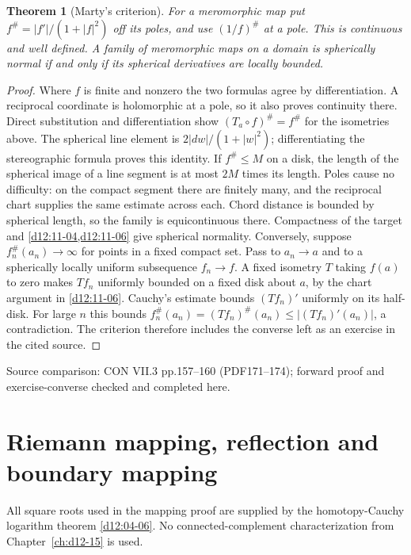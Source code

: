 \documentclass[11pt,a4paper,openany]{book}
\newtheorem{theorem}{Theorem}[chapter]
\theoremstyle{definition}
\theoremstyle{remark}\newtheorem{remark}[theorem]{Remark}
\newcommand{\family}[1]{}
\newcommand{\source}[1]{\par\begingroup\small\sffamily\color{black!65}Source comparison: #1\par\endgroup}
\begin{document}
\begin{theorem}[Marty's criterion]\family{D12.11.07}\label{d12:11-07}
For a meromorphic map put $f^\#=|f'|/(1+|f|^2)$ off its poles, and use $(1/f)^\#$ at a pole. This is continuous and well defined. A family of meromorphic maps on a domain is spherically normal if and only if its spherical derivatives are locally bounded.
\end{theorem}
\begin{proof}
Where $f$ is finite and nonzero the two formulas agree by differentiation. A reciprocal coordinate is holomorphic at a pole, so it also proves continuity there. Direct substitution and differentiation show $(T_a\circ f)^\#=f^\#$ for the isometries above. The spherical line element is $2|dw|/(1+|w|^2)$; differentiating the stereographic formula proves this identity. If $f^\#\le M$ on a disk, the length of the spherical image of a line segment is at most $2M$ times its length. Poles cause no difficulty: on the compact segment there are finitely many, and the reciprocal chart supplies the same estimate across each. Chord distance is bounded by spherical length, so the family is equicontinuous there. Compactness of the target and \cref{d12:11-04,d12:11-06} give spherical normality.
Conversely, suppose $f_n^\#(a_n)\to\infty$ for points in a fixed compact set. Pass to $a_n\to a$ and to a spherically locally uniform subsequence $f_n\to f$. A fixed isometry $T$ taking $f(a)$ to zero makes $T f_n$ uniformly bounded on a fixed disk about $a$, by the chart argument in \cref{d12:11-06}. Cauchy's estimate bounds $(T f_n)'$ uniformly on its half-disk. For large $n$ this bounds $f_n^\#(a_n)=(T f_n)^\#(a_n)\le|(T f_n)'(a_n)|$, a contradiction. The criterion therefore includes the converse left as an exercise in the cited source.
\end{proof}
\source{CON VII.3 pp.157--160 (PDF171--174); forward proof and exercise-converse checked and completed here.}


\chapter{Riemann mapping, reflection and boundary mapping}\label{ch:d12-12}

All square roots used in the mapping proof are supplied by the homotopy-Cauchy logarithm theorem \cref{d12:04-06}. No connected-complement characterization from Chapter~\ref{ch:d12-15} is used.
\end{document}
